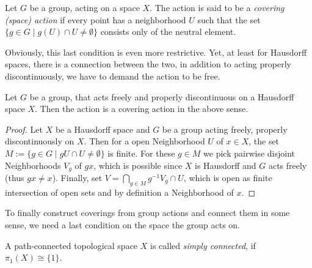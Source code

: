 \begin{definition}
    Let \(G\) be a group, acting on a space \(X\).
    The action is said to be a \emph{covering (space) action} if every point has a neighborhood \(U\) such that the set \(\{g\in G \;\vert\; g(U)\cap U \neq \emptyset\}\) consists only of the neutral element.
\end{definition}

Obviously, this last condition is even more restrictive.
Yet, at least for Hausdorff spaces, there is a connection between the two, in addition to acting properly discontinuously, we have to demand the action to be free.

\begin{lemma}
    Let \(G\) be a group, that acts freely and properly discontinuous on a Hausdorff space \(X\).
    Then the action is a covering action in the above sense.
\end{lemma}
\begin{proof}
    Let \(X\) be a Hausdorff space and \(G\) be a group acting freely, properly discontinuously on \(X\).
    Then for a open Neighborhood \(U\) of \(x\in X\), the set \(M := \{g \in G \;\vert\; gU \cap U \neq \emptyset\}\) is finite.
    For these \(g \in M\) we pick pairwise disjoint Neighborhoods \(V_g\) of \(gx\), which is possible since \(X\) is Hausdorff and \(G\) acts freely (thus \(gx \neq x\)).
    Finally, set \(V = \bigcap_{g \in M} g^{-1} V_g \cap U\), which is open as finite intersection of open sets and by definition a Neighborhood of \(x\).
\end{proof}

To finally construct coverings from group actions and connect them in some sense, we need a last condition on the space the group acts on.

\begin{definition}
    A path-connected topological space \(X\) is called \emph{simply connected}, if \(\pi_1(X)\cong \{1\}\).
\end{definition}


